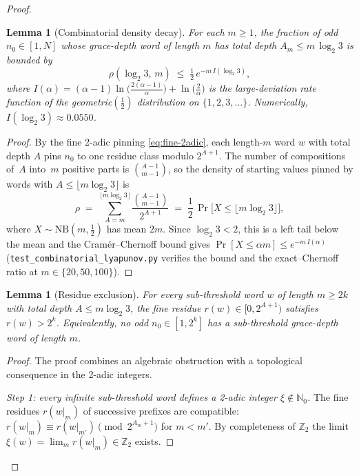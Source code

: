 \documentclass[11pt,a4paper]{article}
\theoremstyle{plain}
\newtheorem{lemma}[theorem]{Lemma}
\theoremstyle{definition}
\theoremstyle{remark}
\numberwithin{equation}{section}
\begin{document}
\begin{proof}
\begin{lemma}[Combinatorial density decay]
\label{lem:combinatorial-density}
For each $m\ge 1$, the fraction of odd $n_0\in[1,N]$ whose
grace-depth word of length $m$ has total depth
$A_m\le m\,\log_2 3$ is bounded by
\begin{equation}\label{eq:nb-density-bound}
  \rho(\log_2 3,\,m)
  \;\le\;
  \tfrac{1}{2}\,e^{-m\,I(\log_2 3)},
\end{equation}
where $I(\alpha)=(\alpha{-}1)\ln\!\bigl(\tfrac{2(\alpha-1)}{\alpha}\bigr)
+\ln\!\bigl(\tfrac{2}{\alpha}\bigr)$ is the large-deviation rate
function of the geometric$(\tfrac{1}{2})$ distribution on
$\{1,2,3,\ldots\}$.  Numerically,
$I(\log_2 3)\approx 0.0550$.
\end{lemma}

\begin{proof}
By the fine 2-adic pinning \eqref{eq:fine-2adic}, each length-$m$
word $w$ with total depth $A$ pins $n_0$ to one residue class
modulo $2^{A+1}$.  The number of compositions of~$A$ into~$m$
positive parts is $\binom{A-1}{m-1}$, so the density of starting
values pinned by words with $A\le\lfloor m\log_2 3\rfloor$ is
\[
  \rho
  \;=\;
  \sum_{A=m}^{\lfloor m\log_2 3\rfloor}
    \frac{\binom{A-1}{m-1}}{2^{A+1}}
  \;=\;
  \frac{1}{2}\,\Pr\!\bigl[X\le\lfloor m\log_2 3\rfloor\bigr],
\]
where $X\sim\mathrm{NB}(m,\tfrac{1}{2})$ has mean $2m$.  Since
$\log_2 3<2$, this is a left tail below the mean and the
Cram\'er--Chernoff bound gives
$\Pr[X\le\alpha m]\le e^{-m\,I(\alpha)}$
(\texttt{test\_combinatorial\_lyapunov.py} verifies the bound
and the exact--Chernoff ratio at $m\in\{20,50,100\}$).
\end{proof}

\begin{lemma}[Residue exclusion]
\label{lem:residue-exclusion}
For every sub-threshold word $w$ of length $m\ge 2k$ with total depth
$A\le m\log_2 3$, the fine residue $r(w)\in[0,2^{A+1})$ satisfies
$r(w)>2^k$.  Equivalently, no odd $n_0\in[1,2^k]$ has a sub-threshold
grace-depth word of length $m$.
\end{lemma}

\begin{proof}
The proof combines an algebraic obstruction with a topological
consequence in the 2-adic integers.

\emph{Step 1: every infinite sub-threshold word defines a 2-adic
integer $\xi\notin\mathbb{N}_0$.}
The fine residues $r(w|_m)$ of successive prefixes are compatible:
$r(w|_m)\equiv r(w|_{m'})\pmod{2^{A_m+1}}$ for $m<m'$.
By completeness of $\mathbb{Z}_2$ the limit $\xi(w)=\lim_m
r(w|_m)\in\mathbb{Z}_2$ exists.


\end{proof}
\end{proof}
\end{document}
